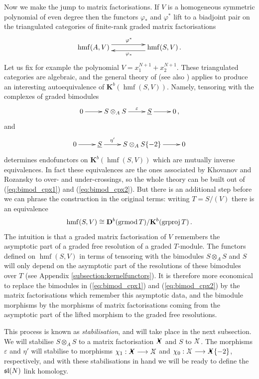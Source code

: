 \documentclass{compositio}
\theoremstyle{definition}
\numberwithin{equation}{section}
\def\K{\mathbf{K}}
\DeclareMathOperator{\hmf}{hmf}
\begin{document}
Now we make the jump to matrix factorisations. If $V$ is a homogeneous symmetric polynomial of even degree then the functors $\varphi_*$ and $\varphi^*$ lift to a biadjoint pair on the triangulated categories of finite-rank graded matrix factorisations
\[
\xymatrix@C+2pc{
\hmf(A, V) \ar@<1ex>[r]^{\varphi^*} & \hmf(S, V) \ar@<1ex>[l]^{\varphi_*} \, .
}
\]
Let us fix for example the polynomial $V = x_1^{N+1} + x_2^{N+1}$. These triangulated categories are algebraic, and the general theory of \cite[Section 8.1]{RouquierMexico} (see also \cite{rickard}) applies to produce an interesting autoequivalence of $\K^b( \hmf(S, V) )$. Namely, tensoring with the complexes of graded bimodules
\begin{equation}\label{eq:bimod_cpx1}
\xymatrix{
0 \ar[r] & S \otimes_A S \ar[r]^-{\varepsilon} & \underline{S} \ar[r] & 0 \, ,
}
\end{equation}
and
\begin{equation}\label{eq:bimod_cpx2}
\xymatrix{
0 \ar[r] & \underline{S} \ar[r]^-{\eta'} & S \otimes_A S\{-2\} \ar[r] & 0
}
\end{equation}
determines endofunctors on $\K^b( \hmf(S, V) )$ which are mutually inverse equivalences. In fact these equivalences are the ones associated by Khovanov and Rozansky to over- and under-crossings, so the whole theory can be built out of (\ref{eq:bimod_cpx1}) and (\ref{eq:bimod_cpx2}). But there is an additional step before we can phrase the construction in the original terms: writing $T = S/(V)$ there is an equivalence
\[
\hmf(S, V) \cong \qderu{b}{\textup{grmod}\, T}/\K^b(\textup{grproj}\, T)\,.
\]
The intuition is that a graded matrix factorisation of $V$ remembers the asymptotic part of a graded free resolution of a graded $T$-module. The functors defined on $\hmf(S,V)$ in terms of tensoring with the bimodules $S \otimes_A S$ and $S$ will only depend on the asymptotic part of the resolutions of these bimodules over $T$ (see Appendix \ref{subsection:kernelfunctors}). It is therefore more economical to replace the bimodules in (\ref{eq:bimod_cpx1}) and (\ref{eq:bimod_cpx2}) by the matrix factorisations which remember this asymptotic data, and the bimodule morphisms by the morphisms of matrix factorisations coming from the asymptotic part of the lifted morphism to the graded free resolutions.

This process is known as \emph{stabilisation}, and will take place in the next subsection. We will stabilise $S \otimes_A S$ to a matrix factorisation $\Xbul$ and $S$ to $\Xcirc$. The morphisms $\varepsilon$ and $\eta'$ will stabilise to morphisms $\chi_1: \Xbul \lto \Xcirc$ and $\chi_0: \Xcirc \lto \Xbul\{-2\}$, respectively, and with these stabilisations in hand we will be ready to define the $\mathfrak{sl}(N)$ link homology.
\end{document}
